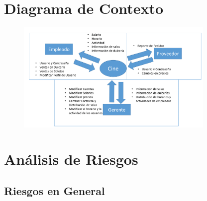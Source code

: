 \documentclass[12pt, fleqn]{report}                             %
\begin{document}
    \clearpage
    \section{Diagrama de Contexto}

        \begin{figure}[h]
            \centering
            \includegraphics[width=0.85\textwidth]{DiagramaContexto}
        \end{figure}


    \clearpage
    \section{Análisis de Riesgos}

        \subsection{Riesgos en General}
\end{document}
